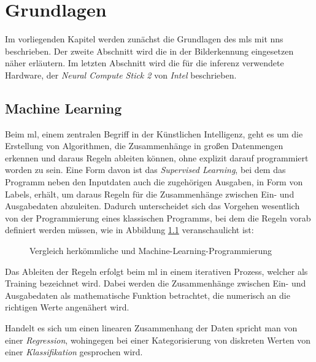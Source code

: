 \chapter{Grundlagen}\label{kap:grundlagen}


Im vorliegenden Kapitel werden zunächst die Grundlagen 
des \Glspl{ml} mit \Glspl{nn}
beschrieben. Der zweite Abschnitt wird die in der 
Bilderkennung eingesetzen  näher erläutern.
Im letzten Abschnitt wird die für die \Gls{inferenz} 
verwendete Hardware, der \textit{Neural Compute Stick 2}
von \textit{Intel} beschrieben.



\section{Machine Learning}\label{sec:ml}

Beim \Gls{ml}, einem zentralen Begriff in der 
Künstlichen Intelligenz, geht es um die Erstellung von Algorithmen, 
die Zusammenhänge in 
großen Datenmengen erkennen und daraus Regeln ableiten können,
ohne explizit darauf programmiert worden zu sein.
Eine Form davon ist das \textit{Supervised Learning}, bei dem
das Programm neben den Inputdaten auch die zugehörigen Ausgaben,
in Form von Labels, erhält, um daraus 
Regeln für die Zusammenhänge zwischen Ein- und Ausgabedaten
abzuleiten.
Dadurch unterscheidet sich das Vorgehen wesentlich von der Programmierung 
eines klassischen Programms, bei dem die Regeln vorab definiert 
werden müssen, wie in Abbildung \ref{fig:classic_vs_ml}
veranschaulicht ist:
\vspace{0.5cm}

\begin{figure}[H]
    \centering
    
    \caption{Vergleich herkömmliche und Machine-Learning-Programmierung}
    \label{fig:classic_vs_ml}
\end{figure}
\vspace{0.5cm}

Das Ableiten der Regeln erfolgt beim \Gls{ml} in einem 
iterativen Prozess, welcher als Training bezeichnet wird.
Dabei werden die Zusammenhänge zwischen Ein- und Ausgabedaten 
als mathematische Funktion betrachtet, die numerisch an die richtigen Werte
angenähert wird.

Handelt es sich um einen linearen Zusammenhang der 
Daten spricht man von einer \textit{Regression}, 
wohingegen bei einer Kategorisierung von diskreten 
Werten von einer \textit{Klassifikation} gesprochen wird.


